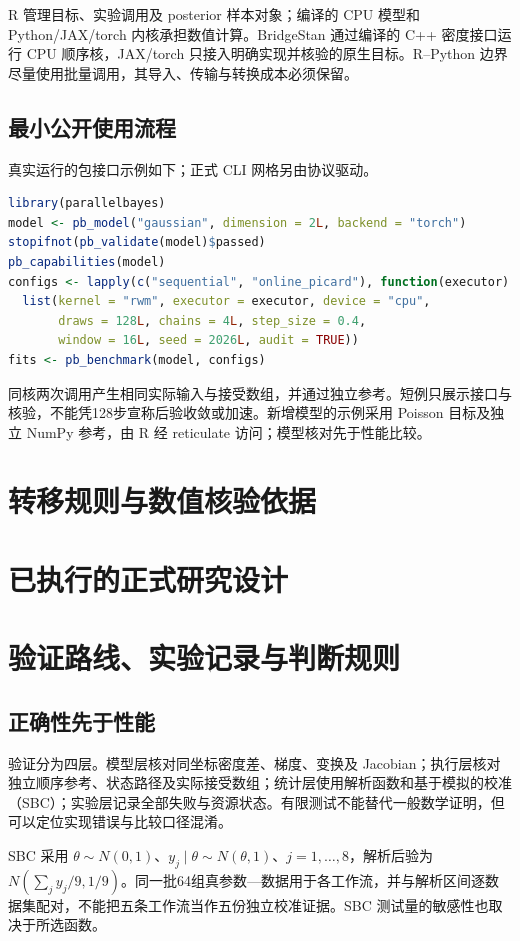 \documentclass[UTF8,zihao=-4,a4paper,fontset=fandol]{ctexart}
\begin{document}
R 管理目标、实验调用及 posterior 样本对象；编译的 CPU 模型和 Python/JAX/torch 内核承担数值计算。BridgeStan 通过编译的 C++ 密度接口运行 CPU 顺序核，JAX/torch 只接入明确实现并核验的原生目标。R–Python 边界尽量使用批量调用，其导入、传输与转换成本必须保留。


\subsection{最小公开使用流程}
真实运行的包接口示例如下；正式 CLI 网格另由协议驱动。
\begin{lstlisting}[language=R]
library(parallelbayes)
model <- pb_model("gaussian", dimension = 2L, backend = "torch")
stopifnot(pb_validate(model)$passed)
pb_capabilities(model)
configs <- lapply(c("sequential", "online_picard"), function(executor)
  list(kernel = "rwm", executor = executor, device = "cpu",
       draws = 128L, chains = 4L, step_size = 0.4,
       window = 16L, seed = 2026L, audit = TRUE))
fits <- pb_benchmark(model, configs)
\end{lstlisting}
同核两次调用产生相同实际输入与接受数组，并通过独立参考。短例只展示接口与核验，不能凭128步宣称后验收敛或加速。新增模型的示例采用 Poisson 目标及独立 NumPy 参考，由 R 经 reticulate 访问；模型核对先于性能比较。

\section{转移规则与数值核验依据}


\section{已执行的正式研究设计}


\section{验证路线、实验记录与判断规则}
\subsection{正确性先于性能}
验证分为四层。模型层核对同坐标密度差、梯度、变换及 Jacobian；执行层核对独立顺序参考、状态路径及实际接受数组；统计层使用解析函数和基于模拟的校准（SBC）；实验层记录全部失败与资源状态。有限测试不能替代一般数学证明，但可以定位实现错误与比较口径混淆。

SBC 采用 $\theta\sim N(0,1)$、$y_j\mid\theta\sim N(\theta,1)$、$j=1,\ldots,8$，解析后验为 $N(\sum_jy_j/9,1/9)$。同一批64组真参数—数据用于各工作流，并与解析区间逐数据集配对，不能把五条工作流当作五份独立校准证据。SBC 测试量的敏感性也取决于所选函数\cite{modrak}。
\end{document}
